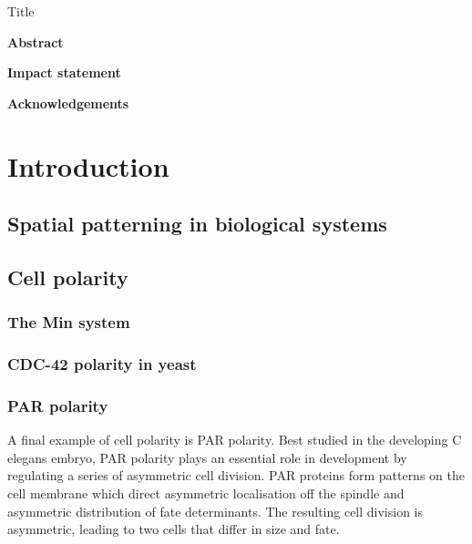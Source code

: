 \documentclass[12pt]{"article"}
\begin{document}
\begin{titlepage}
\centering
{\huge Title\\}
\end{titlepage}


\pagebreak

\begin{Large}
\textbf{Abstract}\\
\end{Large}


\pagebreak

\begin{Large}
\textbf{Impact statement}\\
\end{Large}


\pagebreak

\begin{Large}
\textbf{Acknowledgements}\\
\end{Large}


\tableofcontents
\listoffigures
\listoftables


\clearpage
\section{Introduction}

\subsection{Spatial patterning in biological systems}

\clearpage
\subsection{Cell polarity}
\subsubsection{The Min system}
\subsubsection{CDC-42 polarity in yeast}
\subsubsection{PAR polarity}

A final example of cell polarity is PAR polarity. Best studied in the developing C elegans embryo, PAR polarity plays an essential role in development by regulating a series of asymmetric cell division. PAR proteins form patterns on the cell membrane which direct asymmetric localisation off the spindle and asymmetric distribution of fate determinants. The resulting cell division is asymmetric, leading to two cells that differ in size and fate.\\
\end{document}
